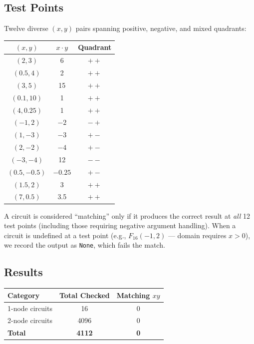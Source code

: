 \documentclass[12pt]{article}
\theoremstyle{definition}
\begin{document}
\subsection{Test Points}

Twelve diverse $(x, y)$ pairs spanning positive, negative, and mixed quadrants:

\begin{center}
\begin{tabular}{ccc}
\toprule
$(x, y)$ & $x \cdot y$ & Quadrant \\
\midrule
$(2, 3)$ & 6 & $++$ \\
$(0.5, 4)$ & 2 & $++$ \\
$(3, 5)$ & 15 & $++$ \\
$(0.1, 10)$ & 1 & $++$ \\
$(4, 0.25)$ & 1 & $++$ \\
$(-1, 2)$ & $-2$ & $-+$ \\
$(1, -3)$ & $-3$ & $+-$ \\
$(2, -2)$ & $-4$ & $+-$ \\
$(-3, -4)$ & 12 & $--$ \\
$(0.5, -0.5)$ & $-0.25$ & $+-$ \\
$(1.5, 2)$ & 3 & $++$ \\
$(7, 0.5)$ & 3.5 & $++$ \\
\bottomrule
\end{tabular}
\end{center}

A circuit is considered ``matching'' only if it produces the correct result at
\emph{all} 12 test points (including those requiring negative argument handling).
When a circuit is undefined at a test point (e.g., $F_{16}(-1, 2)$ — domain
requires $x > 0$), we record the output as \texttt{None}, which fails the match.

\subsection{Results}

\begin{center}
\begin{tabular}{lcc}
\toprule
Category & Total Checked & Matching $xy$ \\
\midrule
1-node circuits & 16 & 0 \\
2-node circuits & 4096 & 0 \\
\midrule
\textbf{Total} & \textbf{4112} & \textbf{0} \\
\bottomrule
\end{tabular}
\end{center}
\end{document}
